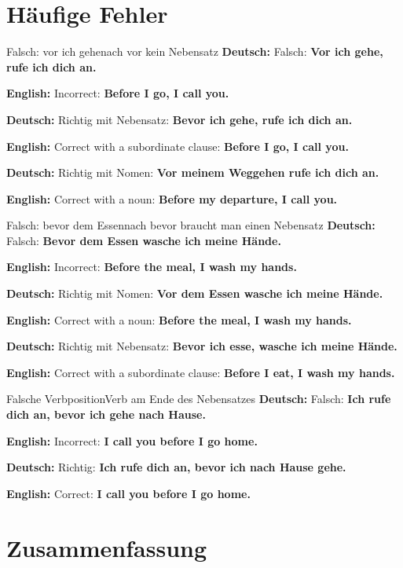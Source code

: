 \documentclass[a4paper,11pt]{article}
\newcommand{\GermanText}[1]{\textbf{Deutsch: }#1\par}
\newcommand{\EnglishText}[1]{{\small\color{SoftGray}\textbf{English: }#1\par}}
\begin{document}
    \section{Häufige Fehler}

        \begin{grammarentry}{Falsch: \glqq vor ich gehe\grqq}{nach \glqq vor\grqq{} kein Nebensatz}
            \GermanText{Falsch: \textbf{Vor ich gehe, rufe ich dich an.}}
            \EnglishText{Incorrect: \textbf{Before I go, I call you.}}

            \GermanText{Richtig mit Nebensatz: \textbf{Bevor ich gehe, rufe ich dich an.}}
            \EnglishText{Correct with a subordinate clause: \textbf{Before I go, I call you.}}

            \GermanText{Richtig mit Nomen: \textbf{Vor meinem Weggehen rufe ich dich an.}}
            \EnglishText{Correct with a noun: \textbf{Before my departure, I call you.}}
        \end{grammarentry}

        \begin{grammarentry}{Falsch: \glqq bevor dem Essen\grqq}{nach \glqq bevor\grqq{} braucht man einen Nebensatz}
            \GermanText{Falsch: \textbf{Bevor dem Essen wasche ich meine Hände.}}
            \EnglishText{Incorrect: \textbf{Before the meal, I wash my hands.}}

            \GermanText{Richtig mit Nomen: \textbf{Vor dem Essen wasche ich meine Hände.}}
            \EnglishText{Correct with a noun: \textbf{Before the meal, I wash my hands.}}

            \GermanText{Richtig mit Nebensatz: \textbf{Bevor ich esse, wasche ich meine Hände.}}
            \EnglishText{Correct with a subordinate clause: \textbf{Before I eat, I wash my hands.}}
        \end{grammarentry}

        \begin{grammarentry}{Falsche Verbposition}{Verb am Ende des Nebensatzes}
            \GermanText{Falsch: \textbf{Ich rufe dich an, bevor ich gehe nach Hause.}}
            \EnglishText{Incorrect: \textbf{I call you before I go home.}}

            \GermanText{Richtig: \textbf{Ich rufe dich an, bevor ich nach Hause gehe.}}
            \EnglishText{Correct: \textbf{I call you before I go home.}}
        \end{grammarentry}

    \section{Zusammenfassung}
\end{document}

